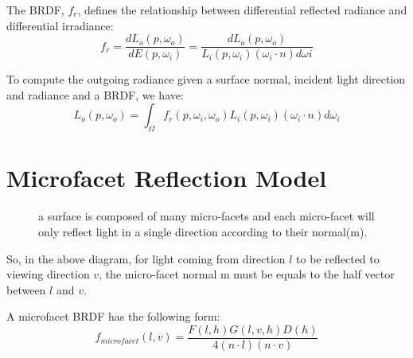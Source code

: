 \documentclass[12pt]{report}
\begin{document}
The BRDF, \(f_{r}\), defines the relationship between differential reflected radiance and differential irradiance:
\begin{equation}
f_{r} = \frac{dL_{o}(p, \omega_{o})}{dE(p, \omega_{i})} = \frac{dL_{o}(p, \omega_{o})}{L_{i}(p, \omega_{i})(\omega_{i} \cdot n)d\omega{i}}
\label{eq:brdf}
\end{equation}

To compute the outgoing radiance given a surface normal, incident light direction and radiance and a BRDF, we have:
\begin{equation}
L_{o}(p, \omega_{o}) = \int_{\Omega}f_{r}(p, \omega_{i}, \omega_{o})L_{i}(p, \omega_{i})(\omega_{i} \cdot n)d\omega_{i}
\label{eq:local_render_equation}
\end{equation}

\section{Microfacet Reflection Model} 

\begin{figure}[htp]
    \centering
    \renewcommand{\thefigure}{\thechapter.\arabic{figure}}
    \caption[Microfacet]{a surface is composed of many micro-facets and each micro-facet will only reflect light in a single direction according to their normal(m).}
    \label{fig:microfacet}
\end{figure}

So, in the above diagram, for light coming from direction \(l\) to be reflected to viewing direction \(v\), the micro-facet normal m must be equals to the half vector between \(l\) and \(v\).

A microfacet BRDF has the following form:
\begin{equation}
f_{microfacet}(l, v) = \frac{F(l, h)G(l, v, h)D(h)}{4(n \cdot l)(n \cdot v)}
\label{eq:microfacet_brdf}
\end{equation}
\end{document}
